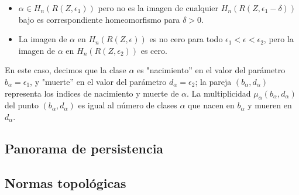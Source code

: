 \begin{itemize}
	\item $\alpha \in H_n(R(Z,\epsilon_1))$ pero no es la imagen de cualquier $H_n(R(Z,\epsilon_1-\delta))$ bajo es correspondiente homeomorfismo para $\delta > 0$.
	\item La imagen de $\alpha$ en $H_n(R(Z,\epsilon))$ es no cero para todo $\epsilon_1 < \epsilon < \epsilon_2$, pero la imagen de $\alpha$ en $H_n(R(Z,\epsilon_2))$ es cero.
\end{itemize}

En este caso, decimos que la clase $\alpha$ es "nacimiento'' en el valor del parámetro $b_\alpha = \epsilon_1$, y "muerte'' en el valor del parámetro $d_\alpha = \epsilon_2$; la pareja $(b_\alpha,d_\alpha)$ representa los indices de  nacimiento y muerte de $\alpha$. La multiplicidad $\mu_\alpha(b_\alpha,d_\alpha)$ del punto $(b_\alpha,d_\alpha)$ es igual al número de clases $\alpha$ que nacen en $b_\alpha$ y mueren en $d_\alpha$.


\subsection{Panorama de persistencia}

\subsection{Normas topológicas}



























